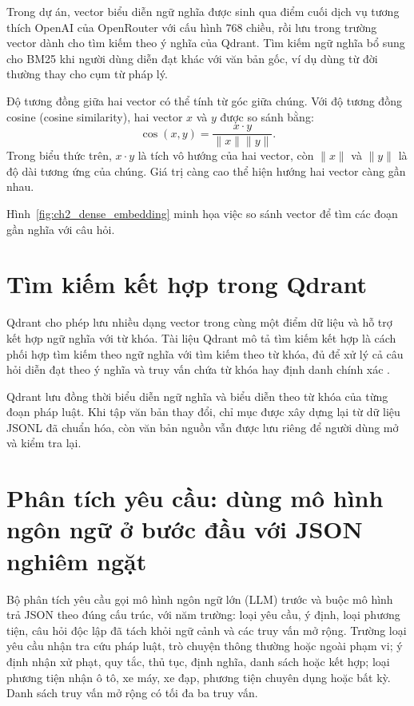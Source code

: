 \documentclass[12pt,a4paper,oneside]{report}
\begin{document}
Trong dự án, vector biểu diễn ngữ nghĩa được sinh qua điểm cuối dịch vụ tương thích OpenAI của OpenRouter với cấu hình 768 chiều, rồi lưu trong trường vector dành cho tìm kiếm theo ý nghĩa của Qdrant. Tìm kiếm ngữ nghĩa bổ sung cho BM25 khi người dùng diễn đạt khác với văn bản gốc, ví dụ dùng từ đời thường thay cho cụm từ pháp lý.

Độ tương đồng giữa hai vector có thể tính từ góc giữa chúng. Với độ tương đồng cosine (cosine similarity), hai vector $x$ và $y$ được so sánh bằng:
\begin{equation}
  \cos(x,y)=\frac{x\cdot y}{\|x\|\|y\|}.
\end{equation}
Trong biểu thức trên, $x\cdot y$ là tích vô hướng của hai vector, còn $\|x\|$ và $\|y\|$ là độ dài tương ứng của chúng. Giá trị càng cao thể hiện hướng hai vector càng gần nhau.

Hình~\ref{fig:ch2_dense_embedding} minh họa việc so sánh vector để tìm các đoạn gần nghĩa với câu hỏi.

\section{Tìm kiếm kết hợp trong Qdrant}
Qdrant cho phép lưu nhiều dạng vector trong cùng một điểm dữ liệu và hỗ trợ kết hợp ngữ nghĩa với từ khóa. Tài liệu Qdrant mô tả tìm kiếm kết hợp là cách phối hợp tìm kiếm theo ngữ nghĩa với tìm kiếm theo từ khóa, đủ để xử lý cả câu hỏi diễn đạt theo ý nghĩa và truy vấn chứa từ khóa hay định danh chính xác \cite{qdrant_hybrid_docs}.

Qdrant lưu đồng thời biểu diễn ngữ nghĩa và biểu diễn theo từ khóa của từng đoạn pháp luật. Khi tập văn bản thay đổi, chỉ mục được xây dựng lại từ dữ liệu JSONL đã chuẩn hóa, còn văn bản nguồn vẫn được lưu riêng để người dùng mở và kiểm tra lại.


\section{Phân tích yêu cầu: dùng mô hình ngôn ngữ ở bước đầu với JSON nghiêm ngặt}
Bộ phân tích yêu cầu gọi mô hình ngôn ngữ lớn (LLM) trước và buộc mô hình trả JSON theo đúng cấu trúc, với năm trường: loại yêu cầu, ý định, loại phương tiện, câu hỏi độc lập đã tách khỏi ngữ cảnh và các truy vấn mở rộng. Trường loại yêu cầu nhận tra cứu pháp luật, trò chuyện thông thường hoặc ngoài phạm vi; ý định nhận xử phạt, quy tắc, thủ tục, định nghĩa, danh sách hoặc kết hợp; loại phương tiện nhận ô tô, xe máy, xe đạp, phương tiện chuyên dụng hoặc bất kỳ. Danh sách truy vấn mở rộng có tối đa ba truy vấn.
\end{document}
